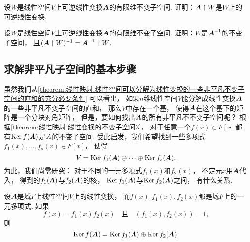 \begin{example}\label{example:线性映射.可逆线性变换在其有限维不变子空间上的限制是可逆线性变换}
设\(W\)是线性空间\(V\)上可逆线性变换\(\boldsymbol{A}\)的有限维不变子空间.
证明：\(\boldsymbol{A} \upharpoonright W\)是\(W\)上的可逆线性变换.
\end{example}

\begin{example}\label{example:线性映射.可逆线性变换的逆变换的不变子空间}
设\(W\)是线性空间\(V\)上可逆线性变换\(\boldsymbol{A}\)的有限维不变子空间.
证明：\(W\)是\(\boldsymbol{A}^{-1}\)的不变子空间，
且\((\boldsymbol{A} \upharpoonright W)^{-1}
= \boldsymbol{A}^{-1} \upharpoonright W\).
\end{example}

\subsection{求解非平凡子空间的基本步骤}
虽然我们从\cref{theorem:线性映射.线性空间可以分解为线性变换的一些非平凡不变子空间的直和的充分必要条件} 可以看出，
如果\(n\)维线性空间\(V\)能分解成线性变换\(\boldsymbol{A}\)的一些非平凡不变子空间的直和，
那么\(V\)中存在一个基，
使得\(\boldsymbol{A}\)在这个基下的矩阵是一个分块对角矩阵，
但是，要如何找出\(\boldsymbol{A}\)的所有非平凡不不变子空间呢？
根据\cref{theorem:线性映射.线性变换的不变子空间3}，
对于任意一个\(f(x) \in F[x]\)都有\(\operatorname{Ker} f(\boldsymbol{A})\)是\(\boldsymbol{A}\)的不变子空间.
受此启发，我们希望找到一些多项式\(f_1(x),\dotsc,f_s(x) \in F[x]\)，
使得\[
	V = \operatorname{Ker} f_1(\boldsymbol{A}) \oplus \dotsb \oplus \operatorname{Ker} f_s(\boldsymbol{A}).
\]
为此，我们尚需研究：
对于不同的一元多项式\(f_1(x)\)和\(f_2(x)\)，
不定元\(x\)用\(\boldsymbol{A}\)代入，
得到的\(f_1(\boldsymbol{A})\)与\(f_2(\boldsymbol{A})\)的核，
\(\operatorname{Ker} f_1(\boldsymbol{A})\)与\(\operatorname{Ker} f_2(\boldsymbol{A})\)之间，
有什么关系.
\begin{theorem}%
设\(\boldsymbol{A}\)是域\(F\)上线性空间\(V\)上的线性变换，
而\(f(x),f_1(x),f_2(x)\)都是域\(F\)上的一元多项式.
如果\[
	f(x) = f_1(x) f_2(x)
	\quad\text{且}\quad
	(f_1(x),f_2(x)) = 1,
\]
则\[
	\operatorname{Ker} f(\boldsymbol{A})
	= \operatorname{Ker} f_1(\boldsymbol{A})
	\oplus \operatorname{Ker} f_2(\boldsymbol{A}).
\]
\end{theorem}

